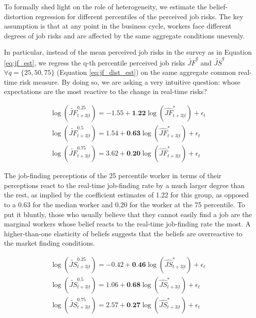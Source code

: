To formally shed light on the role of heterogeneity, we estimate the belief-distortion regression for different percentiles of the perceived job risks. The key assumption is that at any point in the business cycle, workers face different degrees of job risks and are affected by the same aggregate conditions unevenly. 

In particular, instead of the mean perceived job risks in the survey as in Equation \ref{eq:jf_est}, we regress the q-th percentile perceived job risks $\widetilde {JF}^{q}$ and $\widetilde {JS}^q$ $\forall q=\{25,50,75\}$ (Equation \ref{eq:jf_dist_est}) on the same aggregate common real-time risk measure. By doing so, we are asking a very intuitive question: whose expectations are the most reactive to the change in real-time risks? 

   
    \begin{equation}
    \label{eq:jf_dist_est}
    \begin{split}
   \log(\widetilde {JF}^{0.25}_{t+3|t}) = -1.55 + \textbf{1.22} \log(\widehat {JF}^*_{t+3|t}) + \epsilon_{t}  \\
   \log(\widetilde {JF}^{0.5}_{t+3|t}) = 1.54+ \textbf{0.63} \log(\widehat {JF}^*_{t+3|t}) + \epsilon_{t} \\
   \log(\widetilde {JF}^{0.75}_{t+3|t}) = 3.62 + \textbf{0.20} \log(\widehat {JF}^*_{t+3|t}) + \epsilon_{t} 
    \end{split}
\end{equation}

The job-finding perceptions of the 25 percentile worker in terms of their perceptions react to the real-time job-finding rate by a much larger degree than the rest, as implied by the coefficient estimates of 1.22 for this group, as opposed to a 0.63 for the median worker and 0.20 for the worker at the 75 percentile. To put it bluntly, those who usually believe that they cannot easily find a job are the marginal workers whose belief reacts to the real-time job-finding rate the most. A higher-than-one elasticity of beliefs suggests that the beliefs are overreactive to the market finding conditions. 

 \begin{equation}
    \begin{split}
    \log(\widetilde {JS}^{0.25}_{t+3|t})= -0.42 + \textbf{0.46} \log(\widehat {JS}^*_{t+3|t}) + \epsilon_{t}  \\
       \log(\widetilde {JS}^{0.5}_{t+3|t}) = 1.06 + \textbf{0.68} \log(\widehat {JS}^*_{t+3|t}) + \epsilon_{t}  \\
    \log(\widetilde {JS}^{0.75}_{t+3|t}) = 2.57 + \textbf{0.27} \log(\widehat {JS}^*_{t+3|t}) + \epsilon_{t} 
    \end{split}
\end{equation}

